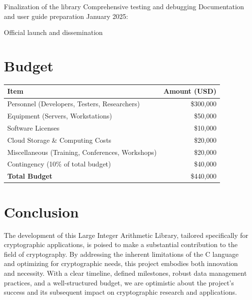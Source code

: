 \documentclass[12pt,a4paper]{article}
\begin{document}
	Finalization of the library
	Comprehensive testing and debugging
	Documentation and user guide preparation
	January 2025:
	
	Official launch and dissemination
	
	\section{Budget}
	
	\begin{center}
		\begin{tabularx}{\textwidth}{X r}
			\toprule
			\textbf{Item} & \textbf{Amount (USD)} \\
			\midrule
			Personnel (Developers, Testers, Researchers) & \$300,000 \\
			Equipment (Servers, Workstations) & \$50,000 \\
			Software Licenses & \$10,000 \\
			Cloud Storage \& Computing Costs & \$20,000 \\
			Miscellaneous (Training, Conferences, Workshops) & \$20,000 \\
			Contingency (10\% of total budget) & \$40,000 \\
			\midrule
			\textbf{Total Budget} & \$440,000 \\
			\bottomrule
		\end{tabularx}
	\end{center}

	\begin{center}
	\end{center}
	
	\newpage
	\section{Conclusion}
	The development of this Large Integer Arithmetic Library, tailored specifically for cryptographic applications, is poised to make a substantial contribution to the field of cryptography. By addressing the inherent limitations of the C language and optimizing for cryptographic needs, this project embodies both innovation and necessity. With a clear timeline, defined milestones, robust data management practices, and a well-structured budget, we are optimistic about the project's success and its subsequent impact on cryptographic research and applications.
	
\end{document}
